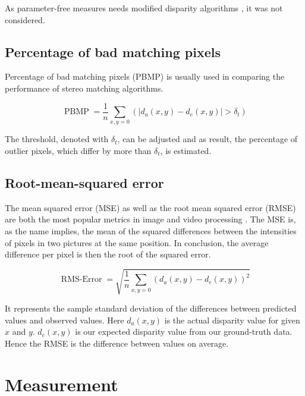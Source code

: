 \noindent As parameter-free measures needs modified disparity algorithms \citep{cyganek2011introduction}, it was not considered.

\subsection*{Percentage of bad matching pixels}

Percentage of bad matching pixels (PBMP) is usually used in comparing the performance of stereo matching algorithms.

\begin{equation}
  \operatorname{PBMP}=\frac{1}{n} \sum_{x,y=0}^{}(|d_a(x,y) - d_e(x,y)| > \delta_t)
\end{equation}

\noindent The threshold, denoted with $\delta_t$, can be adjusted and as result, the percentage of outlier pixels, which differ by more than $\delta_t$, is estimated.

\subsection*{Root-mean-squared error}

The mean squared error (MSE) as well as the root mean squared error (RMSE) are both the most popular metrics in image and video processing \citep{cyganek2011introduction, benoit2008quality, scharstein2002taxonomy}.
The MSE is, as the name implies, the mean of the squared differences between the intensities of pixels in two pictures at the same position.
In conclusion, the average difference per pixel is then the root of the squared error.

\begin{equation}
  \operatorname{RMS-Error}=\sqrt{\frac{1}{n} \sum_{x,y=0}^{}(d_a(x,y) - d_e(x,y))^2}
\end{equation}

\noindent It represents the sample standard deviation of the differences between predicted values and observed values.
Here $d_a(x,y)$ is the actual disparity value for given $x$ and $y$.
$d_e(x,y)$ is our expected disparity value from our ground-truth data.
Hence the RMSE is the difference between values on average.

\section{Measurement}

